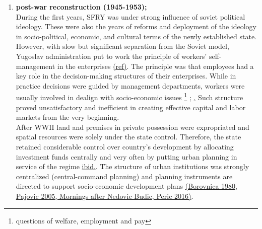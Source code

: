 \documentclass[11pt]{report}
\begin{document}
\begin{enumerate}

\item  \textbf{post-war reconstruction (1945-1953);}
\\
During the first years, SFRY was under strong influence of soviet political ideology. These were also the years of reforms and deployment of the ideology in socio-political, economic, and cultural terms of the newly established state. However, with slow but significant separation from the Soviet model, Yugoslav administration put to work the principle of workers' self-management in the enterprises \href{ref}{(ref)}. The principle was that employees  had  a  key  role  in  the  decision-making structures  of  their enterprises. While in practice decisions  were  guided  by  management departments,  workers were usually involved in dealign with socio-economic issues
\footnote{questions of welfare, employment and pay} \href{ref}{\citealt{estrin_yugoslavia:_1991}}; \href{Lydall,  1984}. Such structure proved unsatisfactory and inefficient in creating effective capital  and  labor  markets from the very beginning.
\\

After WWII land and premises in private possession were expropriated and spatial resources were solely under the state control. Therefore, the state retained considerable control over country's development by allocating investment funds centrally and very often by putting urban planning in service of the regime \href{ref}{ibid.}. The structure of urban institutions was strongly centralized (central-command planning) and planning instruments are directed to support socio-economic development plans \href{ref}{(Borovnica 1980, Pajovic 2005, Mornings after Nedovic Budic, Peric 2016)}. 


\end{enumerate}
\end{document}

